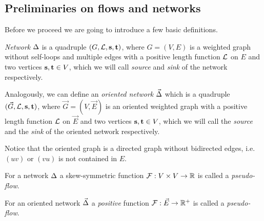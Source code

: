 \documentclass[12pt,oneside,a4paper]{amsart}
\begin{document}
    \subsection{Preliminaries on flows and networks}
      Before we proceed we are going to introduce a few basic definitions.
      \begin{definition}
        \emph{Network} $\Delta$ is a quadruple $(G, \mathcal{L}, \mathbf{s}, \mathbf{t})$, where $G = (V, E)$ is a weighted graph without
        self-loops and multiple edges
        with a positive length function $\mathcal{L}$ on $E$ and two vertices $\mathbf{s}, \mathbf{t} \in V$, which
        we will call \emph{source} and \emph{sink} of the network respectively.

        Analogously, we can define an \emph{oriented network} $\vec{\Delta}$ which is
          a quadruple $(\vec{G}, \mathcal{L}, \mathbf{s}, \mathbf{t})$, where
          $\vec{G} = (V, \vec{E})$ is an oriented weighted graph with
          a positive length function $\mathcal{L}$ on $\vec{E}$ and two vertices $\mathbf{s}, \mathbf{t} \in V$, which
          we will call the \emph{source} and the \emph{sink} of the oriented network respectively.
      \end{definition}
      \begin{remark}
        Notice that the oriented graph is a directed graph without bidirected edges,
          i.e. $(uv)$ or $(vu)$ is not contained in $E$.
      \end{remark}
      \begin{definition}
        For a network $\Delta$ a skew-symmetric function
          $\mathcal{F}: V \times V \to \mathbb{R}$ is called a \emph{pseudo-flow}.
      \end{definition}
      \begin{definition}
        For an oriented network $\vec{\Delta}$ a \emph{positive} function
          $\mathcal{F}: \vec{E} \to \mathbb{R}^{+}$ is called a \emph{pseudo-flow}.
      \end{definition}
\end{document}
